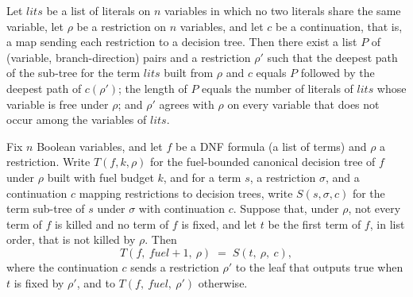 \begin{lemma}
\label{SwitchingLemma.termSubTree_deepPath_split}
\leanok
{}
Let $\mathit{lits}$ be a list of literals on $n$ variables in which no two literals
share the same variable, let $\rho$ be a restriction on $n$ variables, and let $c$ be a
continuation, that is, a map sending each restriction to a decision tree. Then there
exist a list $P$ of (variable, branch-direction) pairs and a restriction $\rho'$ such
that the deepest path of the sub-tree for the term $\mathit{lits}$ built from $\rho$ and
$c$ equals $P$ followed by the deepest path of $c(\rho')$; the length of $P$ equals the
number of literals of $\mathit{lits}$ whose variable is free under $\rho$; and $\rho'$
agrees with $\rho$ on every variable that does not occur among the variables of
$\mathit{lits}$.
\end{lemma}

\begin{lemma}
\label{SwitchingLemma.canonicalDTree_alive_eq_termSubTree}
\leanok
{}
Fix $n$ Boolean variables, and let $f$ be a DNF formula (a list of terms) and $\rho$ a
restriction. Write $T(f, k, \rho)$ for the fuel-bounded canonical decision tree of $f$
under $\rho$ built with fuel budget $k$, and for a term $s$, a restriction $\sigma$, and
a continuation $c$ mapping restrictions to decision trees, write $S(s, \sigma, c)$ for
the term sub-tree of $s$ under $\sigma$ with continuation $c$. Suppose that, under
$\rho$, not every term of $f$ is killed and no term of $f$ is fixed, and let $t$ be the
first term of $f$, in list order, that is not killed by $\rho$. Then
\[
T(f,\ \mathit{fuel}+1,\ \rho) \;=\; S(t,\ \rho,\ c),
\]
where the continuation $c$ sends a restriction $\rho'$ to the leaf that outputs true
when $t$ is fixed by $\rho'$, and to $T(f,\ \mathit{fuel},\ \rho')$ otherwise.
\end{lemma}

